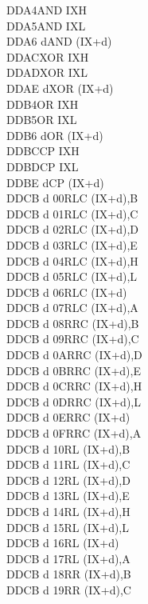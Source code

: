 \begin{multicols}{3}
{\begin{tabbing}
	DDA4\>AND IXH\UNDOC\\
	DDA5\>AND IXL\UNDOC\\
	DDA6 d\>AND (IX+d)\\
	DDAC\>XOR IXH\UNDOC\\
	DDAD\>XOR IXL\UNDOC\\
	DDAE d\>XOR (IX+d)\\
	DDB4\>OR IXH\UNDOC\\
	DDB5\>OR IXL\UNDOC\\
	DDB6 d\>OR (IX+d)\\
	DDBC\>CP IXH\UNDOC\\
	DDBD\>CP IXL\UNDOC\\
	DDBE d\>CP (IX+d)\\
	DDCB d 00\>RLC (IX+d),B\UNDOC\\
	DDCB d 01\>RLC (IX+d),C\UNDOC\\
	DDCB d 02\>RLC (IX+d),D\UNDOC\\
	DDCB d 03\>RLC (IX+d),E\UNDOC\\
	DDCB d 04\>RLC (IX+d),H\UNDOC\\
	DDCB d 05\>RLC (IX+d),L\UNDOC\\
	DDCB d 06\>RLC (IX+d)\\
	DDCB d 07\>RLC (IX+d),A\UNDOC\\
	DDCB d 08\>RRC (IX+d),B\UNDOC\\
	DDCB d 09\>RRC (IX+d),C\UNDOC\\
	DDCB d 0A\>RRC (IX+d),D\UNDOC\\
	DDCB d 0B\>RRC (IX+d),E\UNDOC\\
	DDCB d 0C\>RRC (IX+d),H\UNDOC\\
	DDCB d 0D\>RRC (IX+d),L\UNDOC\\
	DDCB d 0E\>RRC (IX+d)\\
	DDCB d 0F\>RRC (IX+d),A\UNDOC\\
	DDCB d 10\>RL (IX+d),B\UNDOC\\
	DDCB d 11\>RL (IX+d),C\UNDOC\\
	DDCB d 12\>RL (IX+d),D\UNDOC\\
	DDCB d 13\>RL (IX+d),E\UNDOC\\
	DDCB d 14\>RL (IX+d),H\UNDOC\\
	DDCB d 15\>RL (IX+d),L\UNDOC\\
	DDCB d 16\>RL (IX+d)\\
	DDCB d 17\>RL (IX+d),A\UNDOC\\
	DDCB d 18\>RR (IX+d),B\UNDOC\\
	DDCB d 19\>RR (IX+d),C\UNDOC\\

\end{tabbing}}
\end{multicols}
